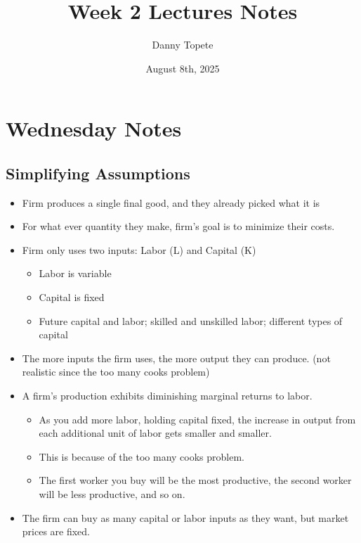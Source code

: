 \documentclass{article}
\title{Week 2 Lectures Notes}
\author{Danny Topete}
\date{August 8th, 2025}
\begin{document}
\maketitle

\section{Wednesday Notes}
\subsection{Simplifying Assumptions}
\begin{itemize}
  \item Firm produces a single final good, and they already picked what it is
  \item For what ever quantity they make, firm's goal is to minimize their costs.
  \item Firm only uses two inputs: Labor (L) and Capital (K)
    \begin{itemize}
      \item Labor is variable
      \item Capital is fixed
      \item Future capital and labor; skilled and unskilled labor; different types of capital
    \end{itemize}
  \item The more inputs the firm uses, the more output they can produce.
    (not realistic since the too many cooks problem)
  \item A firm's production exhibits diminishing marginal returns to labor.
    \begin{itemize}
      \item As you add more labor, holding capital fixed, the increase in output
        from each additional unit of labor gets smaller and smaller.
      \item This is because of the too many cooks problem.
      \item The first worker you buy will be the most productive, the second
        worker will be less productive, and so on.
    \end{itemize}
  \item The firm can buy as many capital or labor inputs as they want, but market prices are fixed.
\end{itemize}
\end{document}

